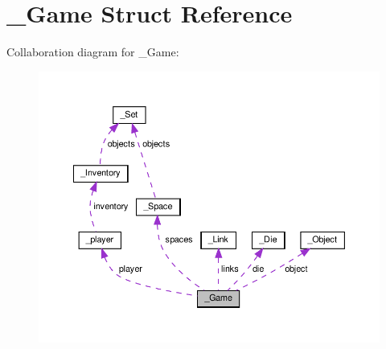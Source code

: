 \hypertarget{struct__Game}{}\section{\+\_\+\+Game Struct Reference}
\label{struct__Game}


Collaboration diagram for \+\_\+\+Game\+:
\nopagebreak
\begin{figure}[H]
\begin{center}
\leavevmode
\includegraphics[width=350pt]{struct__Game__coll__graph}
\end{center}
\end{figure}
